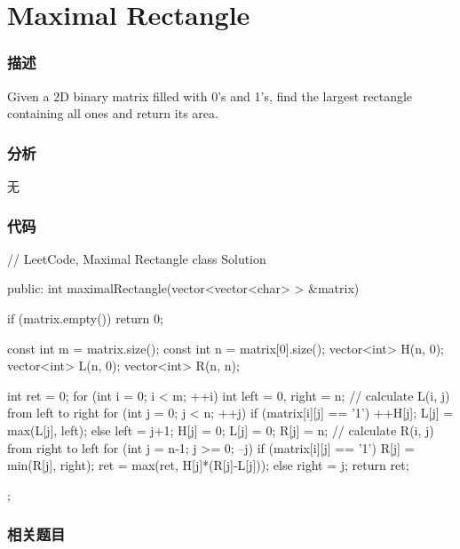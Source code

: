 \section{Maximal Rectangle} %
\label{sec:maximal-rectangle}


\subsubsection{描述}
Given a 2D binary matrix filled with 0's and 1's, find the largest rectangle containing all ones and return its area.


\subsubsection{分析}
无


\subsubsection{代码}
\begin{Code}
// LeetCode, Maximal Rectangle
class Solution {
public:
    int maximalRectangle(vector<vector<char> > &matrix) {
        if (matrix.empty())  return 0;

        const int m = matrix.size();
        const int n = matrix[0].size();
        vector<int> H(n, 0);
        vector<int> L(n, 0);
        vector<int> R(n, n);

        int ret = 0;
        for (int i = 0; i < m; ++i) {
            int left = 0, right = n;
            // calculate L(i, j) from left to right
            for (int j = 0; j < n; ++j) {
                if (matrix[i][j] == '1') {
                    ++H[j];
                    L[j] = max(L[j], left);
                } else {
                    left = j+1;
                    H[j] = 0; L[j] = 0; R[j] = n;
                }
            }
            // calculate R(i, j) from right to left
            for (int j = n-1; j >= 0; --j) {
                if (matrix[i][j] == '1') {
                    R[j] = min(R[j], right);
                    ret = max(ret, H[j]*(R[j]-L[j]));
                } else {
                    right = j;
                }
            }
        }
        return ret;
    }
};
\end{Code}


\subsubsection{相关题目}

